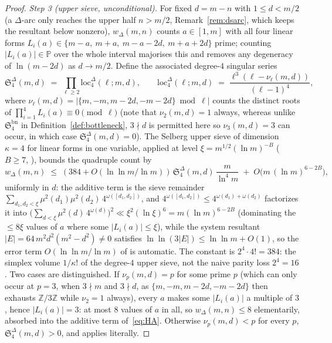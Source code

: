 \documentclass[11pt]{article}
\theoremstyle{plain}
\theoremstyle{definition}
\begin{document}
\begin{proof}
\smallskip
\noindent\emph{Step 3 (upper sieve, unconditional).}
For fixed $d = m - n$ with $1 \le d < m/2$ (a $\Delta$-arc only
reaches the upper half $n > m/2$, Remark~\ref{rem:dsarc}, which
keeps the resultant below nonzero), $w_\Delta(m,n)$ counts
$a \in [1, m]$ with all four linear forms
$L_i(a) \in \{m - a,\ m + a,\ m - a - 2d,\ m + a + 2d\}$ prime;
counting $|L_i(a)| \in \mathbb{P}$ over the whole interval
majorises this and removes any degeneracy of $\ln(m - 2d)$ as
$d \to m/2$. Define the associated degree-$4$ singular series
\[
\mathfrak{S}_4^{\Delta}(m, d)
 \;=\; \prod_{\ell \ge 2} \mathrm{loc}_4^{\Delta}(\ell; m, d),
\qquad
\mathrm{loc}_4^{\Delta}(\ell; m, d)
 \;=\; \frac{\ell^{3}(\ell - \nu_\ell(m,d))}{(\ell - 1)^{4}},
\]
where $\nu_\ell(m,d) = |\{m, -m, m - 2d, -m - 2d\} \bmod \ell|$
counts the distinct roots of $\prod_{i=1}^4 L_i(a) \equiv 0
\pmod \ell$ (note that $\nu_2(m,d) = 1$ always, whereas unlike
$\mathfrak{S}_4^{\mathrm{bn}}$ in Definition~\ref{def:bottleneck},
$3 \nmid d$ is permitted here so $\nu_3(m,d) = 3$ can occur, in
which case $\mathfrak{S}_4^{\Delta}(m,d) = 0$). The Selberg upper
sieve of dimension $\kappa = 4$ for linear forms in one variable,
applied at level $\xi = m^{1/2}(\ln m)^{-B}$ ($B \ge 7$,
\cite[Theorem~5.7]{hr}), bounds the quadruple count by
\begin{equation}\label{eq:HA}\tag{$H_A$}
w_\Delta(m,n) \;\le\; (384 + O(\ln\ln m/\ln m))\,
\mathfrak{S}_4^{\Delta}(m, d)\, \frac{m}{\ln^{4} m}
\;+\; O\bigl(m\,(\ln m)^{6-2B}\bigr) ,
\end{equation}
uniformly in $d$: the additive term is the sieve remainder
$\sum_{d_1, d_2 < \xi}\mu^{2}(d_1)\mu^{2}(d_2)\,
4^{\omega([d_1,d_2])}$, and
$4^{\omega([d_1,d_2])} \le 4^{\omega(d_1) + \omega(d_2)}$
factorizes it into
$\bigl(\sum_{d < \xi}\mu^{2}(d)\,4^{\omega(d)}\bigr)^{2}
\ll \xi^{2}(\ln \xi)^{6} = m(\ln m)^{6-2B}$ (dominating the
$\le 8\xi$ values of $a$ where some $|L_i(a)| \le \xi$), while
the system resultant
$|E| = 64\, m^{2} d^{2} (m^{2} - d^{2}) \ne 0$ satisfies
$\ln\ln(3|E|) \le \ln\ln m + O(1)$, so the error term
$O(\ln\ln m / \ln m)$ of \cite[Theorem~5.7]{hr} is automatic.
The constant is $2^{4} \cdot 4! = 384$: the simplex volume
$1/\kappa!$ of the degree-$4$ upper sieve, not the naive
parity loss $2^{4} = 16$. Two cases are distinguished. If
$\nu_p(m,d) = p$ for some prime $p$ (which can only occur at
$p = 3$, when $3 \nmid m$ and $3 \nmid d$, as
$\{m, -m, m - 2d, -m - 2d\}$ then exhausts $\mathbb{Z}/3\mathbb{Z}$
while $\nu_2 = 1$ always), every $a$ makes some $|L_i(a)|$ a
multiple of $3$, hence $|L_i(a)| = 3$: at most $8$ values of $a$ in
all, so $w_\Delta(m,n) \le 8$ elementarily, absorbed into the
additive term of~\eqref{eq:HA}. Otherwise $\nu_p(m,d) < p$ for
every $p$, $\mathfrak{S}_4^{\Delta}(m,d) > 0$, and
\cite[Theorem~5.7]{hr} applies literally.


\end{proof}
\end{document}

